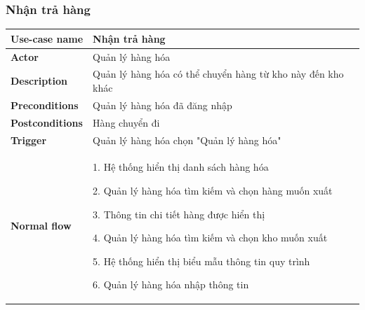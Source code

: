         \subsubsection{Nhận trả hàng}
            \begin{longtable}{| p{} | p{} |} 
                \hline
                    \textbf{Use-case name} 
                & 
                    Nhận trả hàng
                \\
                \hline
                    \textbf{Actor} 
                & 
                    Quản lý hàng hóa
                \\
                \hline
                    \textbf{Description} 
                & 
                    Quản lý hàng hóa có thể chuyển hàng từ kho này đến kho khác
                \\
                \hline
                    \textbf{Preconditions} 
                &
                    Quản lý hàng hóa đã đăng nhập
                \\
                \hline
                    \textbf{Postconditions} 
                & 
                    Hàng chuyển đi
                \\
                \hline
                    \textbf{Trigger} 
                & 
                    Quản lý hàng hóa chọn "Quản lý hàng hóa"
                \\
                \hline
                \begin{flushleft}
                    \textbf{Normal flow}
                \end{flushleft}
                & 
                1. Hệ thống hiển thị danh sách hàng hóa
                    
                    2. Quản lý hàng hóa tìm kiếm và chọn hàng muốn xuất
                    
                    3. Thông tin chi tiết hàng được hiển thị
                    
                    4. Quản lý hàng hóa tìm kiếm và chọn kho muốn xuất
                    
                    5. Hệ thống hiển thị biểu mẫu thông tin quy trình
                    
                    6. Quản lý hàng hóa nhập thông tin
                    

\end{longtable}
